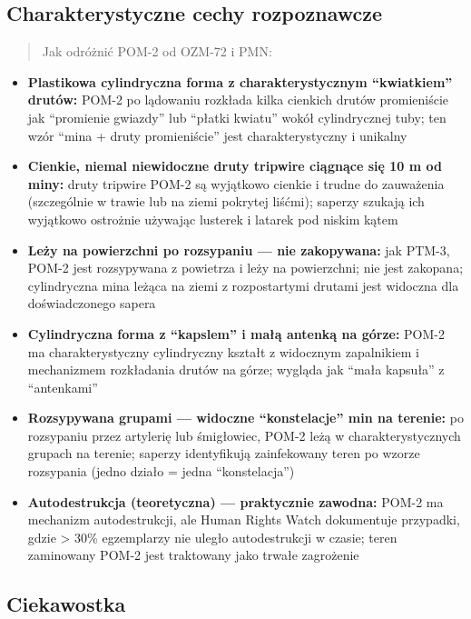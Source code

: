 \documentclass[12pt,oneside]{book}
\providecommand{\tightlist}{%
  \setlength{\itemsep}{0pt}\setlength{\parskip}{0pt}}
\begin{document}
\subsection{Charakterystyczne cechy
rozpoznawcze}\label{charakterystyczne-cechy-rozpoznawcze-125}

\begin{quote}
Jak odróżnić POM-2 od OZM-72 i PMN:
\end{quote}

\begin{itemize}
\tightlist
\item
  \textbf{Plastikowa cylindryczna forma z charakterystycznym
  ``kwiatkiem'' drutów:} POM-2 po lądowaniu rozkłada kilka cienkich
  drutów promieniście jak ``promienie gwiazdy'' lub ``płatki kwiatu''
  wokół cylindrycznej tuby; ten wzór ``mina + druty promieniście'' jest
  charakterystyczny i unikalny
\item
  \textbf{Cienkie, niemal niewidoczne druty tripwire ciągnące się 10 m
  od miny:} druty tripwire POM-2 są wyjątkowo cienkie i trudne do
  zauważenia (szczególnie w trawie lub na ziemi pokrytej liśćmi);
  saperzy szukają ich wyjątkowo ostrożnie używając lusterek i latarek
  pod niskim kątem
\item
  \textbf{Leży na powierzchni po rozsypaniu --- nie zakopywana:} jak
  PTM-3, POM-2 jest rozsypywana z powietrza i leży na powierzchni; nie
  jest zakopana; cylindryczna mina leżąca na ziemi z rozpostartymi
  drutami jest widoczna dla doświadczonego sapera
\item
  \textbf{Cylindryczna forma z ``kapslem'' i małą antenką na górze:}
  POM-2 ma charakterystyczny cylindryczny kształt z widocznym
  zapalnikiem i mechanizmem rozkładania drutów na górze; wygląda jak
  ``mała kapsuła'' z ``antenkami''
\item
  \textbf{Rozsypywana grupami --- widoczne ``konstelacje'' min na
  terenie:} po rozsypaniu przez artylerię lub śmigłowiec, POM-2 leżą w
  charakterystycznych grupach na terenie; saperzy identyfikują
  zainfekowany teren po wzorze rozsypania (jedno działo = jedna
  ``konstelacja'')
\item
  \textbf{Autodestrukcja (teoretyczna) --- praktycznie zawodna:} POM-2
  ma mechanizm autodestrukcji, ale Human Rights Watch dokumentuje
  przypadki, gdzie \textgreater{} 30\% egzemplarzy nie uległo
  autodestrukcji w czasie; teren zaminowany POM-2 jest traktowany jako
  trwałe zagrożenie
\end{itemize}

\subsection{Ciekawostka}\label{ciekawostka-125}
\end{document}
